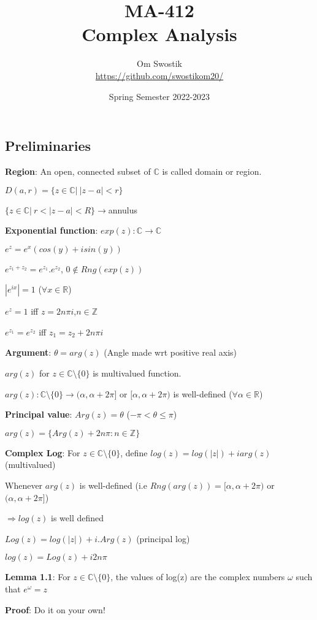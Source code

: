 \documentclass{article}
\title{\textbf{MA-412}\\ \textbf{Complex Analysis}}
\author{Om Swostik\\\url{https://github.com/swostikom20/}}
\date{Spring Semester 2022-2023}
\begin{document}
\maketitle
\clearpage
\begin{flushleft}
\section{Preliminaries}
\textbf{Region}: An open, connected subset of $\mathds{C}$ is called domain or region.

$D(a,r)=\{z\in \mathds{C}|\: |z-a|<r\}$

$\{z\in \mathds{C}|\:r<|z-a|<R\}$$\rightarrow$annulus

\textbf{Exponential function}: $exp(z):\mathds{C}\rightarrow\mathds{C}$

$e^z=e^x(cos(y)+isin(y))$

$e^{z_1+z_2}=e^{z_1}.e^{z_2}$, $0\notin Rng(exp(z))$

$|e^{ix}|=1$ ($\forall x\in \mathds{R}$)

$e^{z}=1$ iff $z=2n\pi i$,$n\in \mathds{Z}$

$e^{z_1}=e^{z_2}$ iff $z_1=z_2+2n\pi i$

\textbf{Argument}: 
$\theta=arg(z)$ (Angle made wrt positive real axis)

$arg(z)$ for $z\in \mathds{C}\setminus \{0\}$ is multivalued function.

$arg(z): \mathds{C}\setminus \{0\}\rightarrow (\alpha,\alpha+2\pi]$ or $[\alpha,\alpha+2\pi)$ is well-defined ($\forall \alpha \in \mathds{R}$)

\textbf{Principal value}: $Arg(z)=\theta$  ($-\pi<\theta\leq \pi$)

$arg(z)=\{Arg(z)+2n\pi:n\in \mathds{Z}\}$

\textbf{Complex Log}: For $z\in \mathds{C}\setminus \{0\}$, define $log(z)=log(|z|)+ iarg(z)$ (multivalued)

Whenever $arg(z)$ is well-defined (i.e $Rng(arg(z))=[\alpha,\alpha+2\pi)$ or $(\alpha,\alpha+2\pi]$)

$\Rightarrow log(z)$ is well defined

$Log(z)=log(|z|)+i.Arg(z)$ (principal log) 

$log(z)=Log(z)+i2n\pi$

\textbf{Lemma 1.1}: For $z\in \mathds{C}\setminus \{0\}$, the values of log(z) are the complex numbers $\omega$ such that $e^{\omega}=z$

\textbf{Proof}: Do it on your own!


\end{flushleft}
\end{document}
